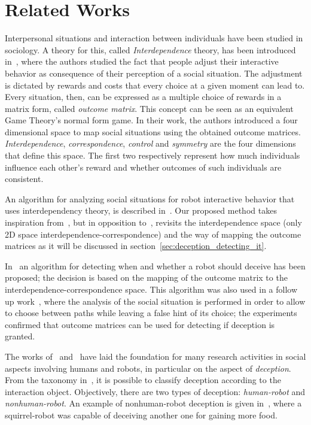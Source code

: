 \section{Related Works}\label{sec:deception_related_works}

Interpersonal situations and interaction between individuals have been studied in sociology. A theory for this, called \textit{Interdependence} theory, has been introduced in~\cite{kelley_interpersonal_1978}, where the authors studied the fact that people adjust their interactive behavior as consequence of their perception of a social situation. The adjustment is dictated by rewards and costs that every choice at a given moment can lead to. Every situation, then, can be expressed as a multiple choice of rewards in a matrix form, called \textit{outcome matrix}. This concept can be seen as an equivalent Game Theory's normal form game. 
In their work, the authors introduced a four dimensional space to map social situations using the obtained outcome matrices. \textit{Interdependence}, \textit{correspondence}, \textit{control} and \textit{symmetry} are the four dimensions that define this space. The first two respectively represent how much individuals influence each other's reward and whether outcomes of such individuals are consistent. 

An algorithm for analyzing social situations for robot interactive behavior that uses interdependency theory, is described in~\cite{wagner_analyzing_2008}. Our proposed method takes inspiration from~\cite{kelley_interpersonal_1978}, but in opposition to~\cite{wagner_analyzing_2008}, revisits the interdependence space (only 2D space interdependence-correspondence) and the way of mapping the outcome matrices as it will be discussed in section~\ref{sec:deception_detecting_it}.

In~\cite{wagner_robot_2009} an algorithm for detecting when and whether a robot should deceive has been proposed; the decision is based on the mapping of the outcome matrix to the interdependence-correspondence space. This algorithm was also used in a follow up work~\cite{wagner_acting_2011}, where the analysis of the social situation is performed in order to allow to choose between paths while leaving a false hint of its choice; the experiments confirmed that outcome matrices can be used for detecting if deception is granted.

The works of~\cite{kelley_interpersonal_1978} and~\cite{wagner_analyzing_2008, wagner_acting_2011, wagner_robot_2009} have laid the foundation for many research activities in social aspects involving humans and robots, in particular on the aspect of \textit{deception}. From the taxonomy in~\cite{shim_taxonomy_2013}, it is possible to classify deception according to the interaction object. Objectively, there are two types of deception: \textit{human-robot} and \textit{nonhuman-robot}. An example of nonhuman-robot deception is given in~\cite{shim_biologically-inspired_2012}, where a squirrel-robot was capable of deceiving another one for gaining more food. 

